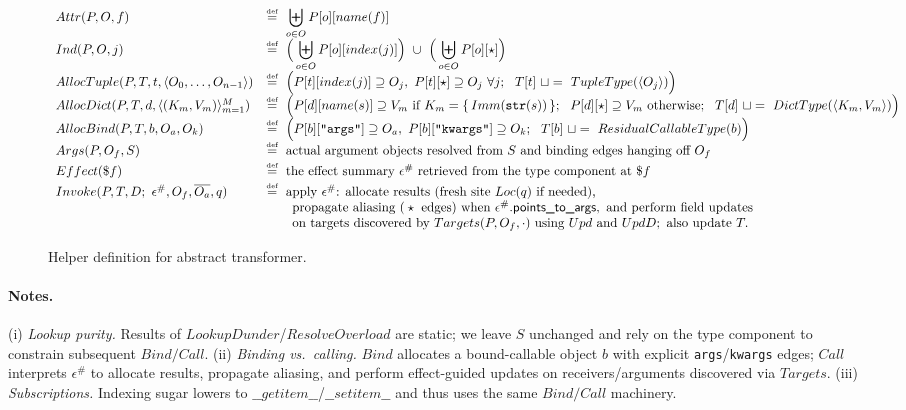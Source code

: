 \begin{figure*}[t]
\centering
\begin{align*}
\begin{array}{ll}
Attr(P,O,f) &\defeq\ \displaystyle\biguplus_{o\in O} P[o][name(f)]
\\[0.2em]
Ind(P,O,j) &\defeq\ \displaystyle\Big(\biguplus_{o\in O} P[o][index(j)]\Big)\ \cup\ \Big(\biguplus_{o\in O} P[o][\star]\Big)
\\[0.2em]
AllocTuple(P,T,t,\langle O_0,\ldots,O_{n-1}\rangle)
  &\defeq\ \Big(P[t][index(j)] \supseteq O_j,\ P[t][\star]\supseteq O_j\ \forall j;\ \ T[t]\ \sqcup=\ TupleType(\langle O_j\rangle)\Big)
\\[0.2em]
AllocDict(P,T,d,\langle (K_m,V_m)\rangle_{m=1}^M)
  &\defeq\ \Big(P[d][name(s)] \supseteq V_m\ \text{if } K_m=\{\,Imm(\texttt{str}(s))\,\};\ \ P[d][\star]\supseteq V_m\ \text{otherwise};\ \ T[d]\ \sqcup=\ DictType(\langle K_m,V_m\rangle)\Big)
\\[0.2em]
AllocBind(P,T,b,O_a,O_k)
  &\defeq\ \Big(P[b][\texttt{"args"}]\supseteq O_a,\ P[b][\texttt{"kwargs"}]\supseteq O_k;\ \ T[b]\ \sqcup=\ ResidualCallableType(b)\Big)
\\[0.2em]
Args(P,O_f,S)
  &\defeq\ \text{actual argument objects resolved from }S\text{ and binding edges hanging off }O_f
\\[0.2em]
Effect(\$f)
  &\defeq\ \text{the effect summary }\epsilon^\#\text{ retrieved from the type component at }\$f
\\[0.2em]
Invoke(P,T,D;\ \epsilon^\#,O_f,\overline{O_a},q)
  &\defeq\ \text{apply }\epsilon^\#\text{: allocate results (fresh site } Loc(q)\text{ if needed),}\\
  &\qquad\text{propagate aliasing (}\star\text{ edges) when }\epsilon^\#.\textsf{points\_to\_args},\ \text{and perform field updates}\\
  &\qquad\text{on targets discovered by }Targets(P,O_f,\cdot)\text{ using } Upd \text{ and } UpdD; \text{ also update }T.
\end{array}
\end{align*}
\caption{Helper definition for abstract transformer.}
\label{fig:tac-transfers-helpers}
\end{figure*}

\paragraph{Notes.}
(i) \emph{Lookup purity.} Results of \(LookupDunder\)/\(ResolveOverload\) are static; we leave \(S\) unchanged and rely on the type component to constrain subsequent \(Bind/Call\).
(ii) \emph{Binding vs.\ calling.} \(Bind\) allocates a bound-callable object \(b\) with explicit \texttt{args}/\texttt{kwargs} edges; \(Call\) interprets \(\epsilon^\#\) to allocate results, propagate aliasing, and perform effect-guided updates on receivers/arguments discovered via \(Targets\).
(iii) \emph{Subscriptions.} Indexing sugar lowers to \(\_\_getitem\_\_\)/\(\_\_setitem\_\_\) and thus uses the same \(Bind/Call\) machinery.

